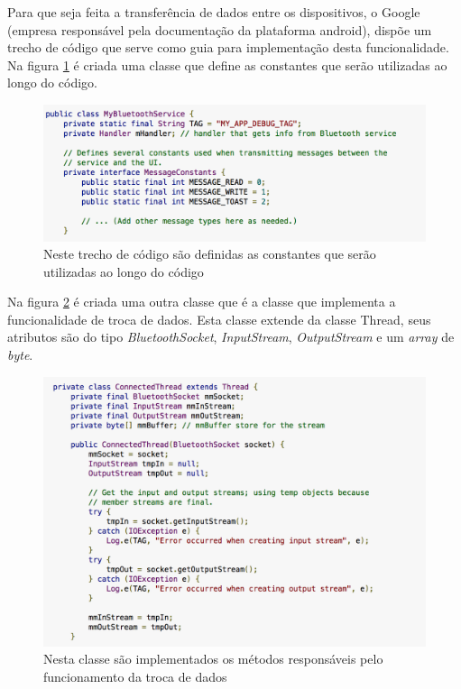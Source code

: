   	Para que seja feita a transferência de dados entre os dispositivos, o Google (empresa responsável pela documentação da plataforma android), dispõe um trecho de código que serve como guia para implementação desta funcionalidade. Na figura \ref{img:trecho1} é criada uma classe que define as constantes que serão utilizadas ao longo do código.
  	
  	\graphicspath{{figuras/}}
  	\begin{figure}[!htb]
  	\centering
  	\includegraphics[scale=0.60]{classe_MyBluetoothService}
  	\caption{Neste trecho de código são definidas as constantes que serão utilizadas ao longo do código}
  	\label{img:trecho1}
  	\end{figure}
  
Na figura \ref{img:trecho2} é criada uma outra classe que é a classe que implementa a funcionalidade de troca de dados. Esta classe extende da classe Thread, seus atributos são do tipo \textit{BluetoothSocket}, \textit{InputStream}, \textit{OutputStream} e um \textit{array} de \textit{byte}.

\graphicspath{{figuras/}}
\begin{figure}[!htb]
\centering
\includegraphics[scale=0.80]{classe_ConnectedThread}
\caption{Nesta classe são implementados os métodos responsáveis pelo funcionamento da troca de dados}
\label{img:trecho2}
\end{figure}

